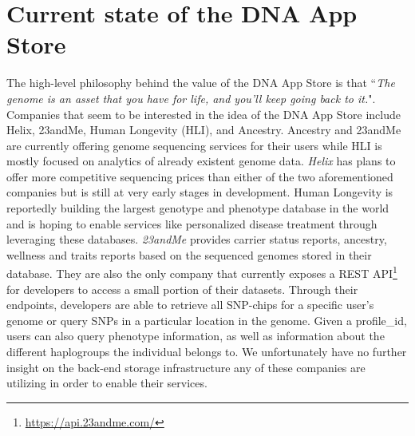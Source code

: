 \documentclass[conference,twocolumn,10pt]{IEEEtran}
\begin{document}
\section{Current state of the DNA App Store}
The high-level philosophy behind the value of the DNA App Store is that ``\textit{The genome is an asset that you have for life, and you’ll keep going back to it.}"\cite{DNAappstore}.
Companies that seem to be interested in the idea of the DNA App Store include Helix, 23andMe, Human Longevity (HLI), and  Ancestry. Ancestry and 23andMe are currently offering genome sequencing services for their users while HLI is mostly focused on analytics of already existent genome data. \textit{Helix} has plans to offer more competitive sequencing prices than either of the two aforementioned companies but is still at very early stages in development. Human Longevity is reportedly building the largest genotype and phenotype database in the world and is hoping to enable services like personalized disease treatment through leveraging these databases. \textit{23andMe} provides carrier status reports, ancestry, wellness and traits reports based on the sequenced genomes stored in their database. They are also the only company that currently exposes a REST API\footnote{\small \url{https://api.23andme.com/}} for developers to access a small portion of their datasets. Through their endpoints, developers are able to retrieve all SNP-chips for a specific user's genome or query SNPs in a particular location in the genome. Given a profile\_id, users can also query phenotype information, as well as information about the different haplogroups the individual belongs to. We unfortunately have no further insight on the back-end storage infrastructure any of these companies are utilizing in order to enable their services.
\end{document}
